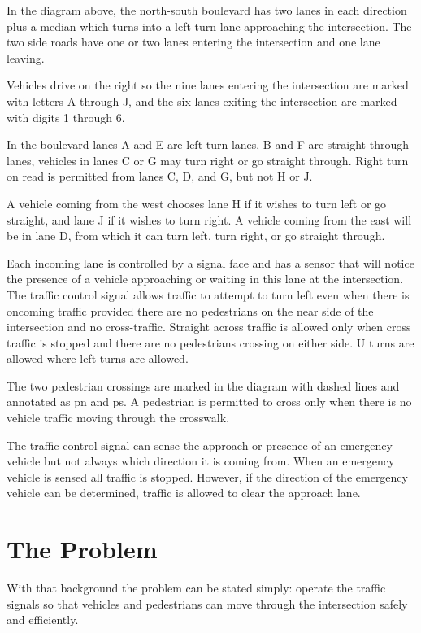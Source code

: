 \documentclass[letterpaper,twoside]{article}
\begin{document}
In the diagram above, the north-south boulevard has two lanes in each
direction plus a median which turns into a left turn lane approaching
the intersection.  The two side roads have one or two lanes entering
the intersection and one lane leaving.

Vehicles drive on the right so the nine lanes entering the intersection are
marked with letters A through J, and the six lanes exiting the intersection are
marked with digits 1 through 6.

In the boulevard lanes A and E are left turn lanes, B and F are straight
through lanes, vehicles in lanes C or G may turn right or go straight through.
Right turn on read is permitted from lanes C, D, and G, but not H or J.

A vehicle coming from the west chooses lane H if it wishes to turn left
or go straight, and lane J if it wishes to turn right.
A vehicle coming from the east will be in lane D, from which it can turn
left, turn right, or go straight through.

Each incoming lane is controlled by a signal face and has a sensor that will
notice the presence of a vehicle approaching or waiting in this lane
at the intersection.
The traffic control signal allows traffic to attempt to turn left even
when there is oncoming traffic provided there are no pedestrians on the near
side of the intersection and no cross-traffic.
Straight across traffic is allowed only when
cross traffic is stopped and there are no pedestrians crossing on either side.
U turns are allowed where left turns are allowed.

The two pedestrian crossings are marked in the diagram with dashed lines
and annotated as pn and ps.
A pedestrian is permitted to cross only when there is no vehicle traffic
moving through the crosswalk.

The traffic control signal can sense the approach or presence of an emergency
vehicle but not always which direction it is coming from.
When an emergency vehicle is sensed all traffic is stopped.
However, if the direction of the emergency vehicle can be determined,
traffic is allowed to clear the approach lane.

\section{The Problem}
With that background the problem can be stated simply: operate the traffic
signals so that vehicles and pedestrians can move through
the intersection safely and efficiently.
\end{document}
